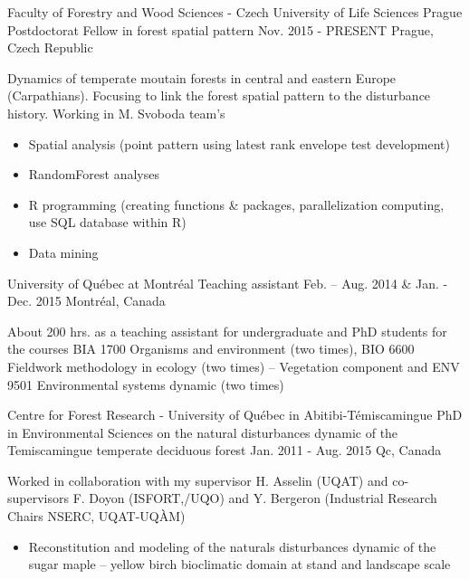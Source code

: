 \begin{cventries}
  \cventry
  {Faculty of Forestry and Wood Sciences - Czech University of Life Sciences Prague}
  {Postdoctorat Fellow in forest spatial pattern}
  {Nov. 2015 - PRESENT}
    {Prague, Czech Republic}
{
    \begin{cvitems}
    \item []{\textnormal{Dynamics of temperate moutain forests in
          central and eastern Europe (Carpathians). Focusing to link
          the forest spatial pattern to the disturbance
          history. Working in M. Svoboda team's}}
      \begin{itemize}[label=$\bullet$,topsep=2pt]
      \item {Spatial analysis (point pattern using latest rank
          envelope test development)}
    \item {RandomForest analyses}
    \item {R programming (creating functions \& packages,
        parallelization computing, use SQL database within R)}
    \item {Data mining}
      \end{itemize}
      \end{cvitems}
  }
  \cventry
  {University of Québec at Montréal}
  {Teaching assistant}
  {Feb. – Aug. 2014 \& Jan. - Dec. 2015}
    {Montréal, Canada}
{
    \begin{cvitems}
    \item []{\textnormal{About 200 hrs. as a teaching assistant for undergraduate and PhD
          students for the courses BIA 1700 Organisms and environment
          (two times), BIO 6600 Fieldwork methodology in ecology (two
          times) – Vegetation component and ENV 9501 Environmental
          systems dynamic (two times)}}
    \end{cvitems}
  }
  \cventry
  {Centre for Forest Research - University of Québec in Abitibi-Témiscamingue}
  {PhD in Environmental Sciences on the natural disturbances dynamic
    of the Temiscamingue temperate deciduous forest}
  {Jan. 2011 - Aug. 2015}
    {Qc, Canada}
    {
      \begin{cvitems}
      \item []{\textnormal{Worked in collaboration with my supervisor
             H. Asselin (UQAT) and co-supervisors F.
            Doyon (ISFORT,/UQO) and Y. Bergeron (Industrial Research Chairs NSERC, UQAT-UQÀM)}}
      \begin{itemize}[label=$\bullet$,topsep=2pt]
        \item {Reconstitution and modeling of the naturals disturbances dynamic of the sugar maple – yellow birch bioclimatic domain at stand and landscape scale}

\end{itemize}
\end{cvitems}}
\end{cventries}
